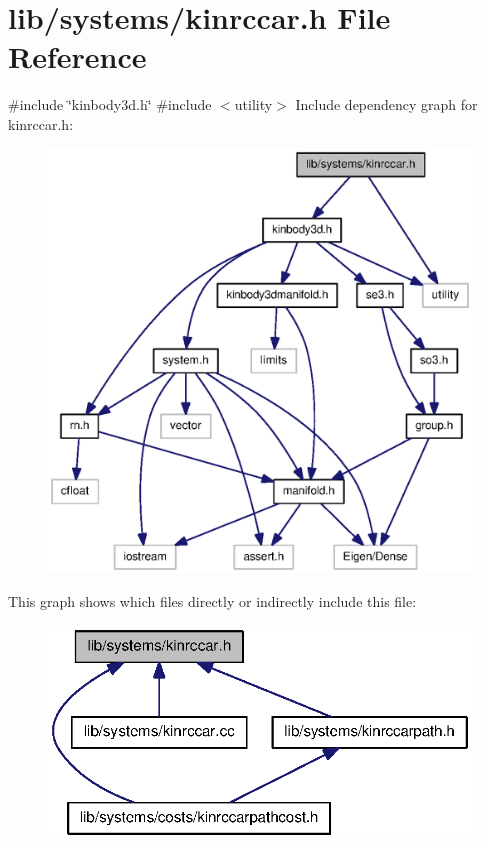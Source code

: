 \section{lib/systems/kinrccar.h \-File \-Reference}
\label{kinrccar_8h}
{\ttfamily \#include \char`\"{}kinbody3d.\-h\char`\"{}}\*
{\ttfamily \#include $<$utility$>$}\*
\-Include dependency graph for kinrccar.\-h\-:
\nopagebreak
\begin{figure}[H]
\begin{center}
\leavevmode
\includegraphics[width=350pt]{kinrccar_8h__incl}
\end{center}
\end{figure}
\-This graph shows which files directly or indirectly include this file\-:
\nopagebreak
\begin{figure}[H]
\begin{center}
\leavevmode
\includegraphics[width=323pt]{kinrccar_8h__dep__incl}
\end{center}
\end{figure}
